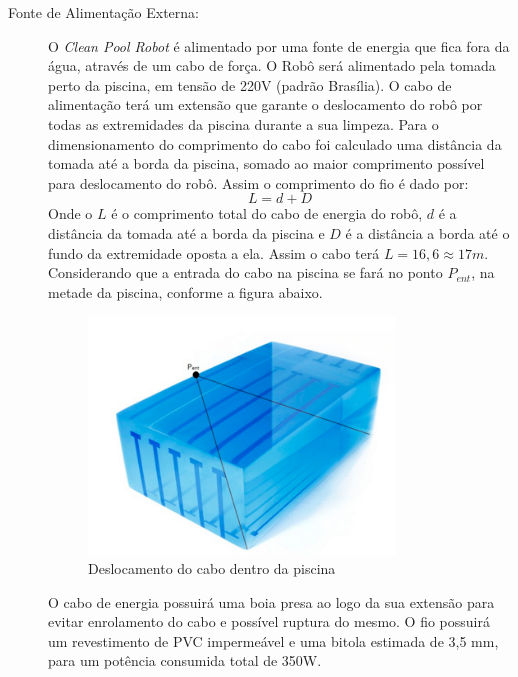 \begin{description}
\item[Fonte de Alimentação Externa:] O \textit{Clean Pool Robot} é alimentado por
uma fonte de energia que fica fora da água, através de um cabo de força. O Robô
será alimentado pela tomada perto da piscina, em tensão de 220V (padrão Brasília).
O cabo de alimentação terá um extensão que garante o deslocamento do robô por todas
as extremidades da piscina durante a sua limpeza. Para o dimensionamento do
comprimento do cabo foi calculado uma distância da tomada até a borda da piscina,
somado ao maior comprimento possível para deslocamento do robô. Assim o comprimento
do fio é dado por:
\begin{displaymath}
  L= d + D
\end{displaymath}
Onde o $L$ é o comprimento total do cabo de energia do robô, $d$ é a distância da
tomada até a borda da piscina e $D$ é a distância a borda até o fundo da
extremidade oposta a ela. Assim o cabo terá $L = 16,6 \approx 17m$. Considerando que
a entrada do cabo na piscina se fará no ponto $P_ {ent}$, na metade da piscina,
conforme a figura abaixo.
\par
\begin{figure}[h]
  \centering
  \includegraphics[width=0.8\textwidth]{figures/cable-desloc.png}
  \caption{Deslocamento do cabo dentro da piscina \cite{assumpcao2014}}
  \label{fig:cable-desloc}
\end{figure}
\FloatBarrier
\par
O cabo de energia possuirá uma boia presa ao logo da sua extensão para evitar
enrolamento do cabo e possível ruptura do mesmo. O fio possuirá um revestimento
de PVC impermeável e uma bitola estimada de 3,5 mm, para um potência consumida
total de 350W.


\end{description}
